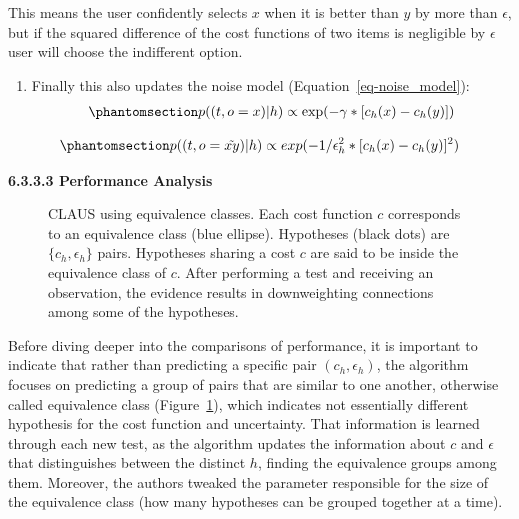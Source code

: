 \documentclass[
  letterpaper,
  numbers=noenddot,
  DIV=11]{scrreprt}
\providecommand{\tightlist}{%
  \setlength{\itemsep}{0pt}\setlength{\parskip}{0pt}}\usepackage{longtable,booktabs,array}
\theoremstyle{plain}
\theoremstyle{definition}
\theoremstyle{plain}
\theoremstyle{remark}
\begin{document}
This means the user confidently selects \(x\) when it is better than
\(y\) by more than \(\epsilon\), but if the squared difference of the
cost functions of two items is negligible by \(\epsilon\) user will
choose the indifferent option.

\begin{enumerate}
\def\labelenumi{\arabic{enumi}.}
\setcounter{enumi}{2}
\tightlist
\item
  Finally this also updates the noise model
  (Equation~\ref{eq-noise_model}):
  \begin{equation}\phantomsection\label{eq-eq3.33}{\begin{aligned}
  p((t, o = x) | h) \propto \exp(-\gamma * [c_h(x) - c_h(y)])
  \end{aligned}}\end{equation}
\end{enumerate}

\begin{equation}\phantomsection\label{eq-eq3.34}{\begin{aligned}
    p((t, o = \tilde{xy}) | h) \propto exp(-1/\epsilon_h^2 * [c_h(x) - c_h(y)]^2)
\end{aligned}}\end{equation}

\textbf{6.3.3.3 Performance Analysis}

\begin{figure}


\caption{\label{fig-equiv_c}CLAUS using equivalence classes. Each cost
function \(c\) corresponds to an equivalence class (blue ellipse).
Hypotheses (black dots) are \(\{c_h,\epsilon_h\}\) pairs. Hypotheses
sharing a cost \(c\) are said to be inside the equivalence class of
\(c\). After performing a test and receiving an observation, the
evidence results in downweighting connections among some of the
hypotheses.}

\end{figure}%

Before diving deeper into the comparisons of performance, it is
important to indicate that rather than predicting a specific pair
\((c_h, \epsilon_h)\), the algorithm focuses on predicting a group of
pairs that are similar to one another, otherwise called equivalence
class (Figure~\ref{fig-equiv_c}), which indicates not essentially
different hypothesis for the cost function and uncertainty. That
information is learned through each new test, as the algorithm updates
the information about \(c\) and \(\epsilon\) that distinguishes between
the distinct \(h\), finding the equivalence groups among them. Moreover,
the authors tweaked the parameter responsible for the size of the
equivalence class (how many hypotheses can be grouped together at a
time).
\end{document}
